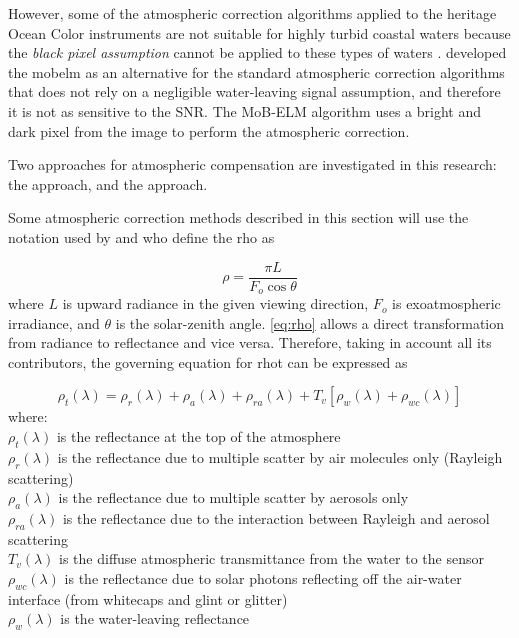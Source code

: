 However, some of the atmospheric correction algorithms applied to the heritage Ocean Color instruments are not suitable for highly turbid coastal waters because the {\it black pixel assumption} cannot be applied to these types of waters \cite{Patt2003}. \cite{Concha2014SPIE} developed the \gls{mobelm} as an alternative for the standard atmospheric correction algorithms that does not rely on a negligible water-leaving signal assumption, and therefore it is not as sensitive to the SNR. The MoB-ELM algorithm uses a bright and dark pixel from the image to perform the atmospheric correction. %

Two approaches for atmospheric compensation are investigated in this research: the \cite{Gordon:1994} approach, and the \cite{Concha2014SPIE} approach.

Some atmospheric correction methods described in this section will use the notation used by \cite{Gordon:1994} and \cite{Ruddick:2000bs} who define the \gls{rho} as 

\begin{equation}\label{eq:rho}
  \rho = \frac{\pi L}{F_o \cos{\theta}}
\end{equation}
where $L$ is upward radiance in the given viewing direction, $F_o$ is exoatmospheric irradiance, and $\theta$ is the solar-zenith angle. \autoref{eq:rho} allows a direct transformation from radiance to reflectance and vice versa. Therefore, taking in account all its contributors, the governing equation for \gls{rhot} can be expressed as

\begin{equation}\label{eq:rho_t}
  \rho_t(\lambda) = \rho_r(\lambda) + \rho_a(\lambda) + \rho_{ra}(\lambda) + T_v[\rho_w(\lambda) + \rho_{wc}(\lambda)]
\end{equation}
where:\\
\indent $\rho_t(\lambda)$ is the reflectance at the top of the atmosphere \\
\indent $\rho_r(\lambda)$ is the reflectance due to multiple scatter by air molecules only (Rayleigh scattering)\\
\indent $\rho_a(\lambda)$ is the reflectance due to multiple scatter by aerosols only\\
\indent $\rho_{ra}(\lambda)$ is the reflectance due to the interaction between Rayleigh and aerosol scattering\\
\indent $T_v(\lambda)$ is the diffuse atmospheric transmittance from the water to the sensor\\
\indent $\rho_{wc}(\lambda)$ is the reflectance due to solar photons reflecting off the air-water interface (from whitecaps and glint or glitter)\\
\indent $\rho_w(\lambda)$ is the water-leaving reflectance

